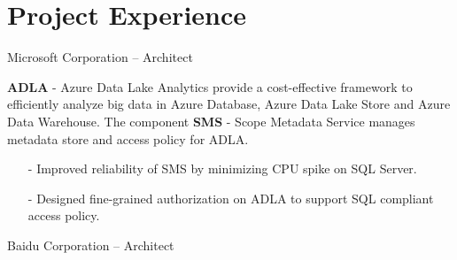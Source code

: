 \documentclass[10pt,a4paper]{moderncv}
\begin{document}
\section{Project Experience}
\vspace{2ex}
	{ Microsoft Corporation -- Architect}{}{}{}{}
	\vspace{1ex}
{
    \textbf{ADLA} - Azure Data Lake Analytics provide a cost-effective framework to efficiently analyze big data in Azure Database, Azure Data Lake Store and Azure Data Warehouse. The component \textbf{SMS} - Scope Metadata Service manages metadata store and access policy for ADLA.
    \begin{itemize}
		\item[-] Improved reliability of SMS by minimizing CPU spike on SQL Server.
		\item[-] Designed fine-grained authorization on ADLA to support SQL compliant access policy.
	\end{itemize}
}
\vspace{2ex}

	{ Baidu Corporation -- Architect}{}{}{}{}
	\vspace{1ex}
\end{document}
